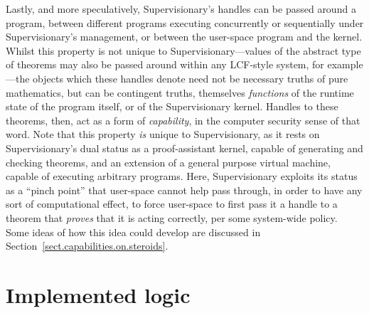 \documentclass[a4paper, UKenglish, cleveref, autoref, thm-restate, colorlinks]{lipics-v2021}
\begin{document}
Lastly, and more speculatively, Supervisionary's handles can be passed around a program, between different programs executing concurrently or sequentially under Supervisionary's management, or between the user-space program and the kernel.
Whilst this property is not unique to Supervisionary---values of the abstract type of theorems may also be passed around within any LCF-style system, for example---the objects which these handles denote need not be necessary truths of pure mathematics, but can be contingent truths, themselves \emph{functions} of the runtime state of the program itself, or of the Supervisionary kernel.
Handles to these theorems, then, act as a form of \emph{capability}, in the computer security sense of that word.
Note that this property \emph{is} unique to Supervisionary, as it rests on Supervisionary's dual status as a proof-assistant kernel, capable of generating and checking theorems, and an extension of a general purpose virtual machine, capable of executing arbitrary programs.
Here, Supervisionary exploits its status as a ``pinch point'' that user-space cannot help pass through, in order to have any sort of computational effect, to force user-space to first pass it a handle to a theorem that \emph{proves} that it is acting correctly, per some system-wide policy.
Some ideas of how this idea could develop are discussed in Section~\ref{sect.capabilities.on.steroids}.

\section{Implemented logic}
\label{sect.implemented.logic}
\end{document}

